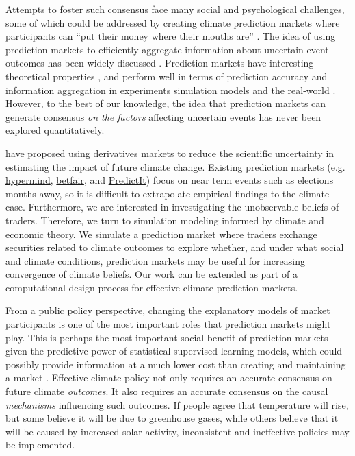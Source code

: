 \documentclass{article}\usepackage[]{graphicx}\usepackage[]{color}
\begin{document}
Attempts to foster such consensus face many social and psychological challenges, some of which could be addressed by creating climate prediction markets where participants can ``put their money where their mouths are'' . The idea of using prediction markets to efficiently aggregate information about uncertain event outcomes has been widely discussed . Prediction markets have interesting theoretical properties , and perform well in terms of prediction accuracy and information aggregation in experiments  simulation models  and the real-world . However, to the best of our knowledge, the idea that prediction markets can generate consensus \emph{on the factors\/} affecting uncertain events has never been explored quantitatively.

 have proposed using derivatives markets to reduce the scientific uncertainty in estimating the impact of future climate change. Existing prediction markets (e.g. \href{https://hypermind.com/hypermind/app.html}{hypermind}, \href{https://www.betfair.com/exchange/}{betfair}, and \href{https://www.predictit.org/}{PredictIt}) focus on near term events such as elections months away, so it is difficult to extrapolate empirical findings to the climate case. Furthermore, we are interested in investigating the unobservable beliefs of traders. Therefore, we turn to simulation modeling informed by climate and economic theory. We simulate a prediction market where traders exchange securities related to climate outcomes to explore whether, and under what social and climate conditions, prediction markets may be useful for increasing convergence of climate beliefs. Our work can be extended as part of a computational design process for effective climate prediction markets.

From a public policy perspective, changing the explanatory models of market participants is one of the most important roles that prediction markets might play. This is perhaps the most important social benefit of prediction markets given the predictive power of statistical supervised learning models, which could possibly provide information at a much lower cost than creating and maintaining a market . Effective climate policy not only requires an accurate consensus on future climate \emph{outcomes\/}. It also requires an accurate consensus on the causal \emph{mechanisms\/} influencing such outcomes. If people agree that temperature will rise, but some believe it will be due to greenhouse gases, while others believe that it will be caused by increased solar activity, inconsistent and ineffective policies may be implemented.
\end{document}
